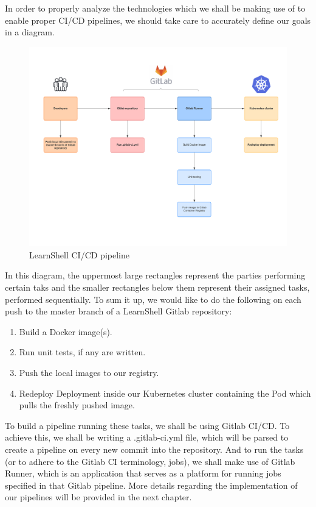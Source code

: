 \documentclass[thesis=B,english]{FITthesis}[2019/12/23]
\begin{document}
In order to properly analyze the technologies which we shall be making use of to enable proper CI/CD pipelines, we should take care to accurately define our goals in a diagram.

\begin{figure}[H]
\centering
\caption{LearnShell CI/CD pipeline}
\hspace*{-3.6cm}
\includegraphics[scale=0.7]{learnshell-cicd}
\end{figure}

In this diagram, the uppermost large rectangles represent the parties performing certain taks and the smaller rectangles below them represent their assigned tasks, performed sequentially. To sum it up, we would like to do the following on each push to the master branch of a LearnShell Gitlab repository:

\begin{enumerate}
  \setlength\itemsep{0em}
  \item Build a Docker image(s).
  \item Run unit tests, if any are written.
  \item Push the local images to our registry.
  \item Redeploy Deployment inside our Kubernetes cluster containing the Pod which pulls the freshly pushed image.
\end{enumerate}

To build a pipeline running these tasks, we shall be using Gitlab CI/CD. To achieve this, we shall be writing a .gitlab-ci.yml file, which will be parsed to create a pipeline on every new commit into the repository. And to run the tasks (or to adhere to the Gitlab CI terminology, jobs), we shall make use of Gitlab Runner, which is an application that serves as a platform for running jobs specified in that Gitlab pipeline. More details regarding the implementation of our pipelines will be provided in the next chapter.
\end{document}
